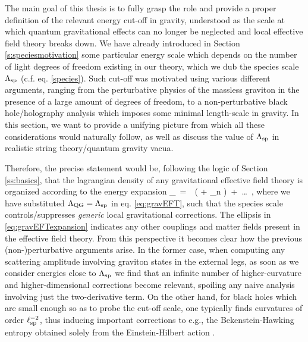 The main goal of this thesis is to fully grasp the role and provide a proper definition of the relevant energy cut-off in gravity, understood as the scale at which quantum gravitational effects can no longer be neglected and local effective field theory breaks down. We have already introduced in Section \ref{s:speciesmotivation} some particular energy scale which depends on the number of light degrees of freedom existing in our theory, which we dub the species scale $\Lambda_{\text{sp}}$ (c.f. eq. \eqref{species}). Such cut-off was motivated using various different arguments, ranging from the perturbative physics of the massless graviton in the presence of a large amount of degrees of freedom, to a non-perturbative black hole/holography analysis which imposes some minimal length-scale in gravity. In this section, we want to provide a unifying picture from which all these considerations would naturally follow, as well as discuss the value of $\Lambda_{\text{sp}}$ in realistic string theory/quantum gravity vacua.

Therefore, the precise statement would be, following the logic of Section \ref{ss:basics}, that the lagrangian density of any gravitational effective field theory is organized according to the energy expansion
%
\beq
{}_{}\, =\, \, \left( + \sum_{n } \right)\, +\, \ldots\, ,
\label{eq:gravEFTexpansion}
\eeq
%
where we have substituted $\Lambda_{\text{QG}} = \Lambda_{\text{sp}}$ in eq. \eqref{eq:gravEFT}, such that the species scale controls/suppresses \emph{generic} local gravitational corrections. The ellipsis in \eqref{eq:gravEFTexpansion} indicates any other couplings and matter fields present in the effective field theory. From this perspective it becomes clear how the previous (non-)perturbative arguments arise. In the former case, when computing any scattering amplitude involving graviton states in the external legs, as soon as we consider energies close to $\Lambda_{\text{sp}}$ we find that an infinite number of higher-curvature and higher-dimensional corrections become relevant, spoiling any naive analysis involving just the two-derivative term. On the other hand, for black holes which are small enough so as to probe the cut-off scale, one typically finds curvatures of order $\ell_{\rm sp}^{-2}$, thus inducing important corrections to e.g., the Bekenstein-Hawking entropy obtained solely from the Einstein-Hilbert action \cite{Sen:2005wa}.


